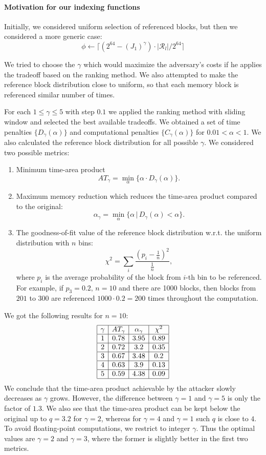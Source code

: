\documentclass[a4paper]{article}
\begin{document}
\paragraph{Motivation for our indexing functions}

Initially, we considered uniform selection of referenced blocks, but then we considered a more generic case:
$$
\phi \leftarrow \lceil(2^{64}-(J_1)^\gamma)\cdot |\mathcal{R}_l|/2^{64} \rceil
$$

We tried to choose the $\gamma$ which would maximize the adversary's costs if he applies the tradeoff based on the ranking method. We also attempted to make the reference block distribution close to uniform, so that each memory block is referenced similar number of times.

For each $1\leq \gamma\leq 5$ with step $0.1$ we applied the ranking method with sliding window and selected the best available tradeoffs. We obtained a set of time penalties $\{D_{\gamma}(\alpha)\}$ and computational penalties $\{C_{\gamma}(\alpha)\}$ for $0.01<\alpha<1$. We also calculated the reference block distribution for all possible $\gamma$. We considered two possible metrics:
\begin{enumerate}
\item Minimum time-area product $$AT_{\gamma} = \min_{\alpha}\{\alpha\cdot D_{\gamma}(\alpha)\}.
$$
\item Maximum memory reduction which reduces the time-area product compared to the original:
$$
\alpha_{\gamma} = \min_{\alpha} \{\alpha\,|\,D_{\gamma}(\alpha)<\alpha\}.
$$
\item The goodness-of-fit value of the reference block distribution w.r.t. the uniform distribution with $n$ bins:
$$
\chi^2 = \sum_i \frac{(p_i-\frac{1}{n})^2}{\frac{1}{n}},
$$
where $p_i$ is the average probability of the block from $i$-th bin to be referenced. For example, if $p_3 = 0.2, \,n=10$ and there are 1000 blocks, then blocks from $201$ to $300$ are referenced $1000\cdot 0.2 =200$ times throughout the computation.  
\end{enumerate}
We got the following results for $n=10$:
$$
\begin{array}{|c|c|c|c|}
\hline
\gamma & AT_{\gamma}&\alpha_{\gamma} &\chi^2\\
\hline
 1&  0.78 & 3.95&0.89\\
  \hline 2 & 0.72 & 3.2& 0.35\\
 \hline 3 & 0.67 & 3.48&0.2\\
  \hline 4 & 0.63 & 3.9&0.13\\
 \hline 5 & 0.59 & 4.38&0.09\\
 \hline
\end{array}
$$
We conclude that the time-area product achievable by the attacker slowly decreases as $\gamma$ grows. However, the difference between $\gamma=1$ and $\gamma=5$ is only the factor of $1.3$. We also see that the time-area product can be kept below the original up to $q=3.2$ for $\gamma=2$, whereas for $\gamma=4$ and $\gamma=1$ such $q$ is close to $4$.
To avoid floating-point computations, we restrict to integer $\gamma$. Thus the optimal values are $\gamma=2$ and $\gamma=3$, where the former is slightly better in the first two metrics. 
\end{document}
